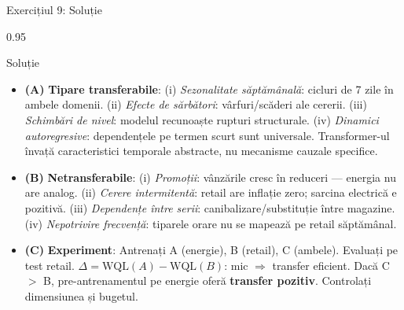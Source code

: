 \documentclass[9pt, aspectratio=169, t]{beamer}
\begin{document}
\begin{frame}{Exercițiul 9: Soluție}
    \begin{cminipage}{0.95\textwidth}
    \begin{exampleblock}{Soluție}
        {\scriptsize
        \begin{itemize}\setlength{\itemsep}{0pt}
            \item \textcolor{MainBlue}{\textbf{(A)}} \textbf{Tipare transferabile}: (i) \textit{Sezonalitate săptămânală}: cicluri de 7 zile în ambele domenii. (ii) \textit{Efecte de sărbători}: vârfuri/scăderi ale cererii. (iii) \textit{Schimbări de nivel}: modelul recunoaște rupturi structurale. (iv) \textit{Dinamici autoregresive}: dependențele pe termen scurt sunt universale. Transformer-ul învață caracteristici temporale abstracte, nu mecanisme cauzale specifice.
            \item \textcolor{MainBlue}{\textbf{(B)}} \textbf{Netransferabile}: (i) \textit{Promoții}: vânzările cresc în reduceri --- energia nu are analog. (ii) \textit{Cerere intermitentă}: retail are inflație zero; sarcina electrică e pozitivă. (iii) \textit{Dependențe între serii}: canibalizare/substituție între magazine. (iv) \textit{Nepotrivire frecvență}: tiparele orare nu se mapează pe retail săptămânal.
            \item \textcolor{MainBlue}{\textbf{(C)}} \textbf{Experiment}: Antrenați A (energie), B (retail), C (ambele). Evaluați pe test retail. $\Delta = \text{WQL}(A) - \text{WQL}(B)$: mic $\Rightarrow$ transfer eficient. Dacă C $>$ B, pre-antrenamentul pe energie oferă \textbf{transfer pozitiv}. Controlați dimensiunea și bugetul.
        \end{itemize}
        }
    \end{exampleblock}
    \end{cminipage}
\end{frame}
\end{document}
